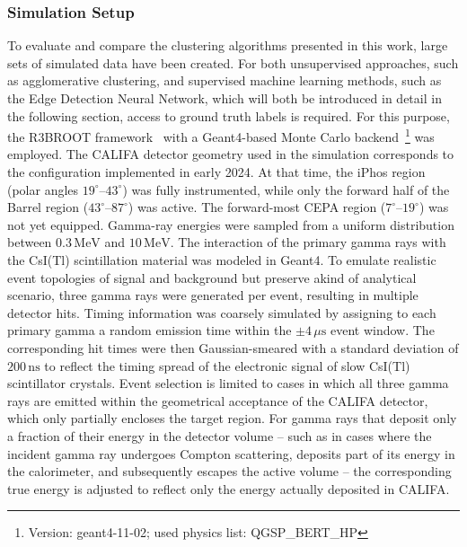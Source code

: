 \subsubsection{Simulation Setup}
To evaluate and compare the clustering algorithms presented in this work, large sets of simulated data have been created. For both unsupervised approaches, such as agglomerative clustering, and supervised machine learning methods, such as the Edge Detection Neural Network, which will both be introduced in detail in the following section, access to ground truth labels is required. For this purpose, the R3BROOT framework~\cite{bertini2011r3broot} with a Geant4-based Monte Carlo \cite{agostinelli2003geant4} backend~\footnote{Version: geant4-11-02; used physics list: QGSP\_BERT\_HP} was employed.\newline
The CALIFA detector geometry used in the simulation corresponds to the configuration implemented in early 2024. At that time, the iPhos region (polar angles $19^\circ$--$43^\circ$) was fully instrumented, while only the forward half of the Barrel region ($43^\circ$--$87^\circ$) was active. The forward-most CEPA region ($7^\circ$--$19^\circ$) was not yet equipped.\newline
Gamma-ray energies were sampled from a uniform distribution between $0.3\,\mathrm{MeV}$ and $10\,\mathrm{MeV}$. The interaction of the primary gamma rays with the CsI(Tl) scintillation material was modeled in Geant4.\newline
To emulate realistic event topologies of signal and background but preserve akind of analytical scenario, three gamma rays were generated per event, resulting in multiple detector hits. Timing information was coarsely simulated by assigning to each primary gamma a random emission time within the $\pm 4\,\mu\mathrm{s}$ event window. The corresponding hit times were then Gaussian-smeared with a standard deviation of $200\,\mathrm{ns}$ to reflect the timing spread of the electronic signal of slow CsI(Tl) scintillator crystals.\newline
Event selection is limited to cases in which all three gamma rays are emitted within the geometrical acceptance of the CALIFA detector, which only partially encloses the target region. For gamma rays that deposit only a fraction of their energy in the detector volume -- such as in cases where the incident gamma ray undergoes Compton scattering, deposits part of its energy in the calorimeter, and subsequently escapes the active volume -- the corresponding true energy is adjusted to reflect only the energy actually deposited in CALIFA.\newline
